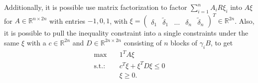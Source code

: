 Additionally, it is possible use matrix factorization to factor $\sum_{i=1}^{n}A_iR\xi_i$
into $A\xi$ for $A \in \mathbb{R}^{n\times2n}$ with entries $-1, 0,
1$, with $\xi = \begin{pmatrix} \delta_1 & \tilde{\delta}_1 & \hdots &
\delta_n & \tilde{\delta}_n \end{pmatrix}^{T}  \in \mathbb{R}^{2n}  $. Also,
it is possible to pull the inequality constraint into a single constraints
under the same $\xi$ with a $c \in \mathbb{R}^{2n}$ and $D \in \mathbb{R}^{2n
\times 2n}$ consisting of $n$ blocks of $\gamma_iB$, to get
\begin{align}
    \text{max} \quad & 1^{T}A\xi \label{eq: quadratically_constrained_general}\\
    \text{s.t.:}\quad & c^{T} \xi + \xi^{T} D\xi \le 0\\
          & \xi \ge 0.
\end{align}



\nocite{bot_optimization}
\nocite{optimal_routing_cfmm}
\nocite{boyd_optimization}
\nocite{cfmms_basics}
\nocite{convex_network_flows}
\nocite{uniswap}
\nocite{balancer}
\printbibliography


